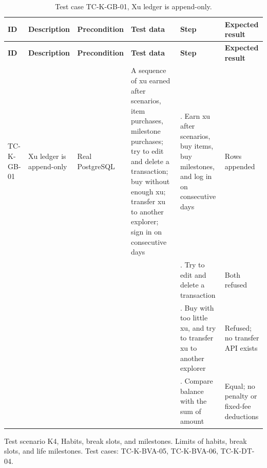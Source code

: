 {\footnotesize{}\renewcommand{\arraystretch}{1.1}
\begin{longtable}{|>{\raggedright\arraybackslash}p{}|>{\raggedright\arraybackslash}p{}|>{\raggedright\arraybackslash}p{}|>{\raggedright\arraybackslash}p{}|>{\raggedright\arraybackslash}p{}|>{\raggedright\arraybackslash}p{}|}
\caption{Test case TC-K-GB-01, Xu ledger is append-\allowbreak{}only.} \\
\hline
\textbf{ID} & \textbf{Description} & \textbf{Precondition} & \textbf{Test data} & \textbf{Step} & \textbf{Expected result} \\ \hline
\endfirsthead
\hline
\textbf{ID} & \textbf{Description} & \textbf{Precondition} & \textbf{Test data} & \textbf{Step} & \textbf{Expected result} \\ \hline
\endhead
TC-K-GB-01 & Xu ledger is append-only & Real PostgreSQL & A sequence of xu earned after scenarios, item purchases, milestone purchases; try to edit and delete a transaction; buy without enough xu; transfer xu to another explorer; sign in on consecutive days & 1. Earn xu after scenarios, buy items, buy milestones, and log in on consecutive days & Rows appended \\ \cline{5-6}
 &  &  &  & 2. Try to edit and delete a transaction & Both refused \\ \cline{5-6}
 &  &  &  & 3. Buy with too little xu, and try to transfer xu to another explorer & Refused; no transfer API exists \\ \cline{5-6}
 &  &  &  & 4. Compare balance with the sum of amount & Equal; no penalty or fixed-fee deductions \\ \hline
\end{longtable}
}

Test scenario K4, Habits, break slots, and milestones. Limits of habits, break slots, and life milestones. Test cases: TC-\allowbreak{}K-\allowbreak{}BVA-\allowbreak{}05, TC-\allowbreak{}K-\allowbreak{}BVA-\allowbreak{}06, TC-K-DT-04.

